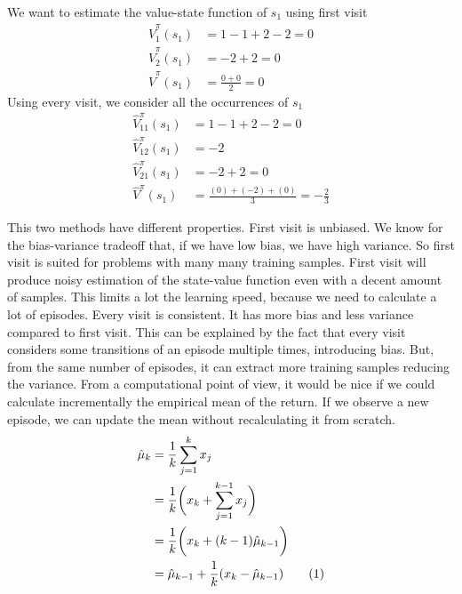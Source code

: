 \documentclass[main.tex]{subfiles}
\newcommand\numberthis{\addtocounter{equation}{1}\tag{\theequation}}
\begin{document}
We want to estimate the value-state function of $s_1$ using first visit
\begin{align*}
    \hat{V}^{\pi}_1(s_1) & = 1 - 1 + 2 - 2 = 0   \\
    \hat{V}^{\pi}_2(s_1) & = -2 + 2 = 0          \\
    \hat{V}^{\pi}(s_1)   & = \frac{0 + 0}{2} = 0
\end{align*}
Using every visit, we consider all the occurrences of $s_1$
\begin{align*}
    \hat{V}^{\pi}_{11}(s_1) & = 1 -1 +2 -2 = 0                            \\
    \hat{V}^{\pi}_{12}(s_1) & = -2                                        \\
    \hat{V}^{\pi}_{21}(s_1) & = -2 + 2 = 0                                \\
    \hat{V}^{\pi}(s_1)      & = \frac{(0) + (-2) + (0)}{3} = -\frac{2}{3}
\end{align*}
\newline
\par
\noindent
This two methods have different properties. First visit is unbiased. We know for the bias-variance tradeoff that, if we have low bias, we have high variance. So first visit is suited for problems with many many training samples. First visit will produce noisy estimation of the state-value function even with a decent amount of samples. This limits a lot the learning speed, because we need to calculate a lot of episodes. Every visit is consistent\footnotemark {}. It has more bias and less variance compared to first visit. This can be explained by the fact that every visit considers some transitions of an episode multiple times, introducing bias. But, from the same number of episodes, it can extract more training samples reducing the variance.
From a computational point of view, it would be nice if we could calculate incrementally the empirical mean of the return. If we observe a new episode, we can update the mean without recalculating it from scratch.
\newpage
\begin{align*}
    \hat{\mu}_k & = \frac{1}{k} \sum_{j=1}^k x_j                                                                 \\
                & =\frac{1}{k} \bigg( x_k + \sum_{j=1}^{k-1} x_j \bigg)                                          \\
                & =\frac{1}{k} \bigg( x_k + (k-1) \hat{\mu}_{k-1} \bigg)                                         \\
                & =\hat{\mu}_{k-1} + \frac{1}{k}(x_k - \hat{\mu}_{k-1}) \numberthis \label{eqn-incremental_mean}
\end{align*}
\end{document}
